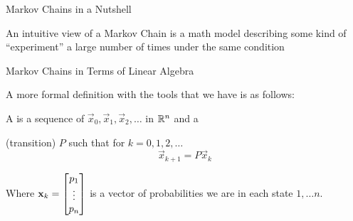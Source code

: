 \documentclass[xcoler=dvipsnames, aspectratio=169]{beamer}
\begin{document}
    \begin{frame}{Markov Chains in a Nutshell}
        \begin{tcolorbox}
            An intuitive view of a Markov Chain is a math model describing some kind of ``experiment''
            a large number of times under the same condition
        \end{tcolorbox}
    \end{frame}
    \begin{frame}{Markov Chains in Terms of Linear Algebra}
        \begin{tcolorbox}
            A more formal definition with the tools that we have is as follows:

            A  is a sequence of 
            $\vec{x}_0,\vec{x}_1,\vec{x}_2,\dots$ in $\mathbb{R}^{n}$ and a 
            
             (transition)  $P$ such that for $k=0,1,2,\dots$
            \[
                \vec{x}_{k+1} = P\vec{x}_k
            \]
        \end{tcolorbox}\pause
        Where $\mathbf{x}_k = \begin{bmatrix}p_1\\\vdots\\p_n\end{bmatrix}$ is a vector of probabilities we are in each
        state $1,\dots n$.
    \end{frame}
\end{document}
